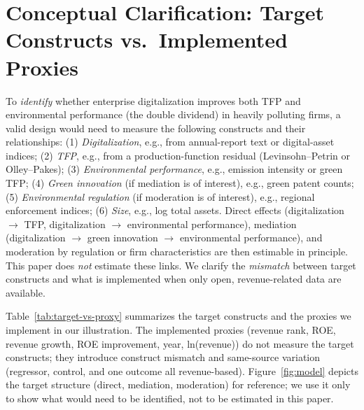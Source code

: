 
\section{Conceptual Clarification: Target Constructs vs.\ Implemented Proxies}
\label{sec:theory}

To \emph{identify} whether enterprise digitalization improves both TFP and environmental performance (the double dividend) in heavily polluting firms, a valid design would need to measure the following constructs and their relationships: (1) \emph{Digitalization}, e.g., from annual-report text or digital-asset indices; (2) \emph{TFP}, e.g., from a production-function residual (Levinsohn--Petrin or Olley--Pakes); (3) \emph{Environmental performance}, e.g., emission intensity or green TFP; (4) \emph{Green innovation} (if mediation is of interest), e.g., green patent counts; (5) \emph{Environmental regulation} (if moderation is of interest), e.g., regional enforcement indices; (6) \emph{Size}, e.g., log total assets. Direct effects (digitalization $\to$ TFP, digitalization $\to$ environmental performance), mediation (digitalization $\to$ green innovation $\to$ environmental performance), and moderation by regulation or firm characteristics are then estimable in principle. This paper does \emph{not} estimate these links. We clarify the \emph{mismatch} between target constructs and what is implemented when only open, revenue-related data are available.

Table~\ref{tab:target-vs-proxy} summarizes the target constructs and the proxies we implement in our illustration. The implemented proxies (revenue rank, ROE, revenue growth, ROE improvement, year, ln(revenue)) do not measure the target constructs; they introduce construct mismatch and same-source variation (regressor, control, and one outcome all revenue-based). Figure~\ref{fig:model} depicts the target structure (direct, mediation, moderation) for reference; we use it only to show what would need to be identified, not to be estimated in this paper.

